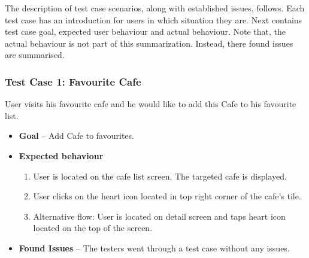 The description of test case scenarios, along with established issues, follows. Each test case has an introduction for users in which situation they are.  Next contains test case goal, expected user behaviour and actual behaviour. Note that, the actual behaviour is not part of this summarization. Instead, there found issues are summarised. 

\subsubsection{Test Case 1: Favourite Cafe}
User visits his favourite cafe and he would like to add this Cafe to his favourite list. 
\begin{itemize}
    \item \textbf{Goal} -- Add Cafe to favourites.
    \item \textbf{Expected behaviour}
    \begin{enumerate}
        \item User is located on the cafe list screen. The targeted cafe is displayed.
        \item User clicks on the heart icon located in top right corner of the cafe's tile. 
        \item Alternative flow: User is located on detail screen and taps heart icon located on the top of the screen. 
    \end{enumerate}
    \item \textbf{Found Issues} -- The testers went through a test case without any issues.
\end{itemize}

